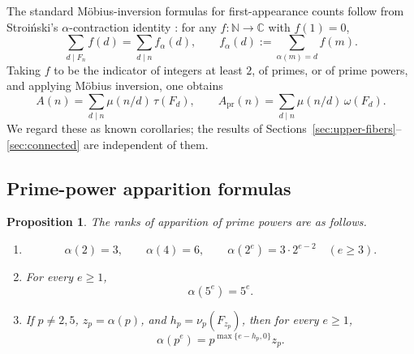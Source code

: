 \documentclass[11pt,letterpaper]{article}
\numberwithin{equation}{section}
\theoremstyle{plain}
\newtheorem{proposition}[theorem]{Proposition}
\theoremstyle{definition}
\theoremstyle{remark}
\newcommand{\NN}{\mathbb{N}}
\begin{document}
The standard M\"obius-inversion formulas for first-appearance counts follow
from Stroi\'nski's $\alpha$-contraction identity
\cite{Stroinski2016AlphaContraction}: for any $f:\NN\to\mathbb{C}$ with
$f(1)=0$,
\begin{equation}\label{eq:stroinski}
\sum_{d\mid F_n}f(d)=\sum_{d\mid n}f_\alpha(d),
\qquad
f_\alpha(d):=\sum_{\alpha(m)=d}f(m).
\end{equation}
Taking $f$ to be the indicator of integers at least $2$, of primes, or of
prime powers, and applying M\"obius inversion, one obtains
\begin{equation}\label{eq:mobius-birth}
A(n)=\sum_{d\mid n}\mu(n/d)\,\tau(F_d),
\qquad
A_{\mathrm{pr}}(n)=\sum_{d\mid n}\mu(n/d)\,\omega(F_d).
\end{equation}
We regard these as known corollaries; the results of
Sections~\ref{sec:upper-fibers}--\ref{sec:connected} are independent of them.

\subsection{Prime-power apparition formulas}\label{subsec:prime-power}

\begin{proposition}\label{prop:prime-power-ladders}
The ranks of apparition of prime powers are as follows.
\begin{enumerate}[label=\textup{(\roman*)}]
\item
\[
\alpha(2)=3,
\qquad
\alpha(4)=6,
\qquad
\alpha(2^e)=3\cdot 2^{e-2}\quad(e\ge3).
\]
\item For every \(e\ge1\),
\[
\alpha(5^e)=5^e.
\]
\item If \(p\ne2,5\), \(z_p=\alpha(p)\), and
\(h_p=\nu_p(F_{z_p})\), then for every \(e\ge1\),
\[
\alpha(p^e)=p^{\max\{e-h_p,0\}}z_p.
\]
\end{enumerate}
\end{proposition}
\end{document}

